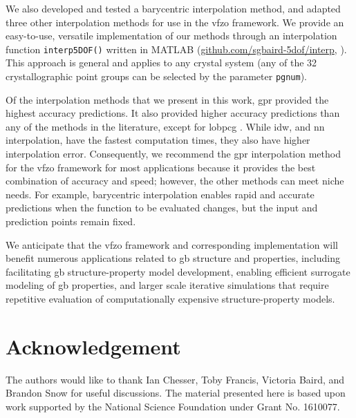 \documentclass[final,twocolumn,12pt]{elsarticle}
\newcommand{\inpt}{input}
\newcommand{\outpt}{prediction}
\begin{document}
We also developed and tested a barycentric interpolation method, and adapted three other interpolation methods for use in the \gls{vfzo} framework. We provide an easy-to-use, versatile implementation of our methods through an interpolation function \texttt{interp5DOF()} written in MATLAB  (\url{github.com/sgbaird-5dof/interp}, \cite{bairdFiveDegreeofFreedom5DOF2020}).  This approach is general and applies to any crystal system (any of the 32 crystallographic point groups can be selected by the parameter \texttt{pgnum}). 

Of the interpolation methods that we present in this work, \Gls{gpr} provided the highest accuracy predictions. It also provided higher accuracy predictions than any of the methods in the literature, except for \gls{lobpcg} \cite{shenDeterminingGrainBoundary2019}. While \gls{idw}, and \gls{nn} interpolation, have the fastest computation times, they also have higher interpolation error. Consequently, we recommend the \gls{gpr} interpolation method for the \gls{vfzo} framework for most applications because it provides the best combination of accuracy and speed; however, the other methods can meet niche needs. For example, barycentric interpolation enables rapid and accurate predictions when the function to be evaluated changes, but the \inpt{} and \outpt{} points remain fixed. 

We anticipate that the \gls{vfzo} framework and corresponding implementation will benefit numerous applications related to \gls{gb} structure and properties, including facilitating \gls{gb} structure-property model development, enabling efficient surrogate modeling of \gls{gb} properties, and larger scale iterative simulations that require repetitive evaluation of computationally expensive structure-property models.

\section*{Acknowledgement}
\label{sec:acknowledgement}

The authors would like to thank Ian Chesser, Toby Francis, Victoria Baird, and Brandon Snow for useful discussions. The material presented here is based upon work supported by the National Science Foundation under Grant No. 1610077.

% 
\end{document}
